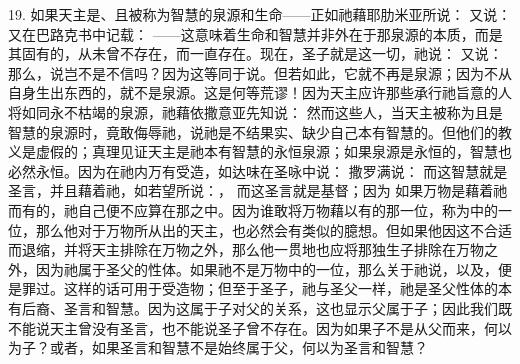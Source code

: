 19. 如果天主是、且被称为智慧的泉源和生命——正如祂藉耶肋米亚所说： 又说： 又在巴路克书中记载： ——这意味着生命和智慧并非外在于那泉源的本质，而是其固有的，从未曾不存在，而一直存在。现在，圣子就是这一切，祂说： 又说： 那么，说岂不是不信吗？因为这等同于说。但若如此，它就不再是泉源；因为不从自身生出东西的，就不是泉源。这是何等荒谬！因为天主应许那些承行祂旨意的人将如同永不枯竭的泉源，祂藉依撒意亚先知说： 然而这些人，当天主被称为且是智慧的泉源时，竟敢侮辱祂，说祂是不结果实、缺少自己本有智慧的。但他们的教义是虚假的；真理见证天主是祂本有智慧的永恒泉源；如果泉源是永恒的，智慧也必然永恒。因为在祂内万有受造，如达味在圣咏中说： 撒罗满说： 而这智慧就是圣言，并且藉着祂，如若望所说：， 而这圣言就是基督；因为 如果万物是藉着祂而有的，祂自己便不应算在那之中。因为谁敢将万物藉以有的那一位，称为中的一位，那么他对于万物所从出的天主，也必然会有类似的臆想。但如果他因这不合适而退缩，并将天主排除在万物之外，那么他一贯地也应将那独生子排除在万物之外，因为祂属于圣父的性体。如果祂不是万物中的一位，那么关于祂说，以及，便是罪过。这样的话可用于受造物；但至于圣子，祂与圣父一样，祂是圣父性体的本有后裔、圣言和智慧。因为这属于子对父的关系，这也显示父属于子；因此我们既不能说天主曾没有圣言，也不能说圣子曾不存在。因为如果子不是从父而来，何以为子？或者，如果圣言和智慧不是始终属于父，何以为圣言和智慧？\par

